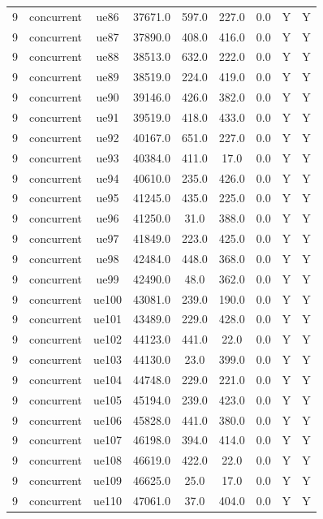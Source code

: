 \begin{table}[ht]
\begin{tabular}{|c|c|c|c|c|c|c|c|c|}
9 & concurrent & ue86 & 37671.0 & 597.0 & 227.0 & 0.0 & Y & Y \\
9 & concurrent & ue87 & 37890.0 & 408.0 & 416.0 & 0.0 & Y & Y \\
9 & concurrent & ue88 & 38513.0 & 632.0 & 222.0 & 0.0 & Y & Y \\
9 & concurrent & ue89 & 38519.0 & 224.0 & 419.0 & 0.0 & Y & Y \\
9 & concurrent & ue90 & 39146.0 & 426.0 & 382.0 & 0.0 & Y & Y \\
9 & concurrent & ue91 & 39519.0 & 418.0 & 433.0 & 0.0 & Y & Y \\
9 & concurrent & ue92 & 40167.0 & 651.0 & 227.0 & 0.0 & Y & Y \\
9 & concurrent & ue93 & 40384.0 & 411.0 & 17.0 & 0.0 & Y & Y \\
9 & concurrent & ue94 & 40610.0 & 235.0 & 426.0 & 0.0 & Y & Y \\
9 & concurrent & ue95 & 41245.0 & 435.0 & 225.0 & 0.0 & Y & Y \\
9 & concurrent & ue96 & 41250.0 & 31.0 & 388.0 & 0.0 & Y & Y \\
9 & concurrent & ue97 & 41849.0 & 223.0 & 425.0 & 0.0 & Y & Y \\
9 & concurrent & ue98 & 42484.0 & 448.0 & 368.0 & 0.0 & Y & Y \\
9 & concurrent & ue99 & 42490.0 & 48.0 & 362.0 & 0.0 & Y & Y \\
9 & concurrent & ue100 & 43081.0 & 239.0 & 190.0 & 0.0 & Y & Y \\
9 & concurrent & ue101 & 43489.0 & 229.0 & 428.0 & 0.0 & Y & Y \\
9 & concurrent & ue102 & 44123.0 & 441.0 & 22.0 & 0.0 & Y & Y \\
9 & concurrent & ue103 & 44130.0 & 23.0 & 399.0 & 0.0 & Y & Y \\
9 & concurrent & ue104 & 44748.0 & 229.0 & 221.0 & 0.0 & Y & Y \\
9 & concurrent & ue105 & 45194.0 & 239.0 & 423.0 & 0.0 & Y & Y \\
9 & concurrent & ue106 & 45828.0 & 441.0 & 380.0 & 0.0 & Y & Y \\
9 & concurrent & ue107 & 46198.0 & 394.0 & 414.0 & 0.0 & Y & Y \\
9 & concurrent & ue108 & 46619.0 & 422.0 & 22.0 & 0.0 & Y & Y \\
9 & concurrent & ue109 & 46625.0 & 25.0 & 17.0 & 0.0 & Y & Y \\
9 & concurrent & ue110 & 47061.0 & 37.0 & 404.0 & 0.0 & Y & Y \\

\end{tabular}
\end{table}
